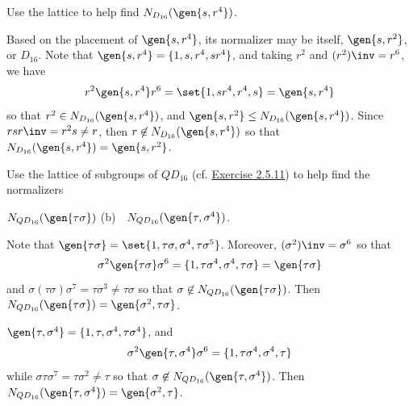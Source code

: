 \begin{exercise}\label{ex2.5.19}
    Use the lattice to help find $N_{D_{16}}(\gen{s, r^4})$.
\end{exercise}

\begin{sol}
    Based on the placement of $\gen{s, r^4}$, its normalizer may be itself, $\gen{s, r^2}$, or $D_{16}$. Note that $\gen{s, r^4} = \{1, s, r^4, sr^4\}$, and taking $r^2$ and $(r^2)\inv = r^6$, we have
    \[r^2\gen{s, r^4}r^6 = \set{1, sr^4, r^4, s} = \gen{s, r^4}\]
    so that $r^2 \in N_{D_{16}}(\gen{s, r^4})$, and $\gen{s, r^2} \leq N_{D_{16}}(\gen{s, r^4})$. Since $rsr\inv = r^2s \neq r$, then $r \not\in N_{D_{16}}(\gen{s, r^4})$ so that $N_{D_{16}}(\gen{s, r^4}) = \gen{s, r^2}$.
\end{sol}

\begin{exercise}\label{ex2.5.20}
    Use the lattice of subgroups of $QD_{16}$ (cf. \hyperref[ex2.5.11]{Exercise 2.5.11}) to help find the normalizers
    \begin{subproblems}
        \item $N_{QD_{16}}(\gen{\tau\sigma})$ \quad (b)~~$N_{QD_{16}}(\gen{\tau, \sigma^4})$.
    \end{subproblems}
\end{exercise}

\begin{solalph}
    \item Note that $\gen{\tau\sigma} = \set{1, \tau\sigma, \sigma^4, \tau\sigma^5}$. Moreover, $(\sigma^2)\inv = \sigma^6$ so that
    \[\sigma^2\gen{\tau\sigma}\sigma^6 = \{1, \tau\sigma^4, \sigma^4, \tau\sigma\} = \gen{\tau\sigma}\]
    and $\sigma(\tau\sigma)\sigma^7 = \tau\sigma^3 \neq \tau\sigma$ so that $\sigma \not\in N_{QD_{16}}(\gen{\tau\sigma})$. Then $N_{QD_{16}}(\gen{\tau\sigma}) = \gen{\sigma^2, \tau\sigma}$.
    \item $\gen{\tau, \sigma^4} = \{1, \tau, \sigma^4, \tau\sigma^4\}$, and 
    \[\sigma^2\gen{\tau, \sigma^4}\sigma^6 = \{1, \tau\sigma^4, \sigma^4, \tau\}\]
    while $\sigma\tau\sigma^7 = \tau\sigma^2 \neq \tau$ so that $\sigma \not\in N_{QD_{16}}(\gen{\tau, \sigma^4})$. Then $N_{QD_{16}}(\gen{\tau, \sigma^4}) = \gen{\sigma^2, \tau}$.
\end{solalph}